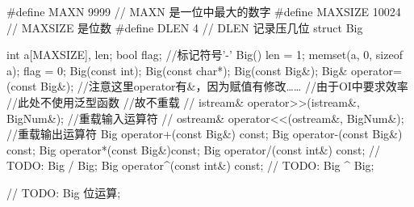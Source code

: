 \begin{cppcode}
#define MAXN 9999
// MAXN 是一位中最大的数字
#define MAXSIZE 10024
// MAXSIZE 是位数
#define DLEN 4
// DLEN 记录压几位
struct Big {
  int a[MAXSIZE], len;
  bool flag;  //标记符号'-'
  Big() {
    len = 1;
    memset(a, 0, sizeof a);
    flag = 0;
  }
  Big(const int);
  Big(const char*);
  Big(const Big&);
  Big& operator=(const Big&);  //注意这里operator有&，因为赋值有修改……
  //由于OI中要求效率
  //此处不使用泛型函数
  //故不重载
  // istream& operator>>(istream&,  BigNum&);   //重载输入运算符
  // ostream& operator<<(ostream&,  BigNum&);   //重载输出运算符
  Big operator+(const Big&) const;
  Big operator-(const Big&) const;
  Big operator*(const Big&)const;
  Big operator/(const int&) const;
  // TODO: Big / Big;
  Big operator^(const int&) const;
  // TODO: Big ^ Big;

  // TODO: Big 位运算;

}
\end{cppcode}
